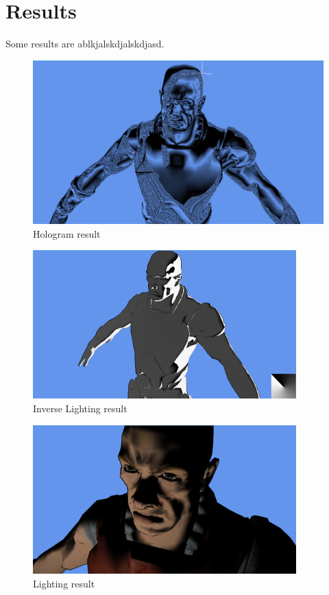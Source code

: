 \documentclass[annual]{acmsiggraph}
\begin{document}
\section{Results}
\label{sec:results}
Some results are ablkjalskdjalskdjasd.

\begin{figure}[h]
	\centering
	\includegraphics[width=5.5in]{images/hologram}
	\caption{Hologram result}
	\label{fig:hologram}
\end{figure}

\begin{figure}[h]
	\centering
	\includegraphics[width=4in]{images/inverse_lighting}
	\caption{Inverse Lighting result}
	\label{fig:inverseLighting}
\end{figure}

\begin{figure}[h]
	\centering
	\includegraphics[width=4in]{images/lighting}
	\caption{Lighting result}
	\label{fig:lightingResult}
\end{figure}
\end{document}

